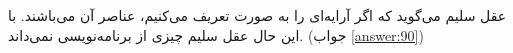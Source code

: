 \section{}
\paragraph{}\label{hint:238}
عقل سلیم می‌گوید که اگر آرایه‌ای را به صورت  تعریف می‌کنیم، عناصر آن  می‌باشند. با این حال عقل سلیم چیزی از برنامه‌نویسی نمی‌داند. (جواب \ref{answer:90})